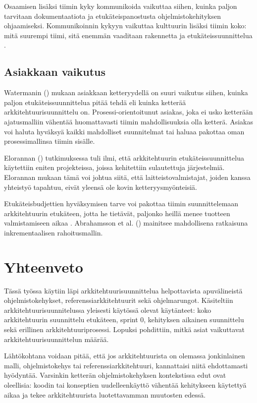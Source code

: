Osaamisen lisäksi tiimin kyky kommunikoida vaikuttaa siihen, kuinka paljon tarvitaan dokumentaatiota ja etukäteispanostusta ohjelmistokehityksen ohjaamiseksi. Kommunikoinnin kykyyn vaikuttaa kulttuurin lisäksi tiimin koko: mitä suurempi tiimi, sitä enemmän vaaditaan rakennetta ja etukäteissuunnittelua \citep{waterman_how_2015}.

\section{Asiakkaan vaikutus}
Watermanin (\citeyear{waterman_how_2015}) mukaan asiakkaan ketteryydellä on suuri vaikutus siihen, kuinka paljon etukäteissuunnittelua pitää tehdä eli kuinka ketterää arkkitehtuurisuunnittelu on. Prosessi-orientoitunut asiakas, joka ei usko ketterään ajatusmalliin vähentää huomattavasti tiimin mahdollisuuksia olla ketterä. Asiakas voi haluta hyväksyä kaikki mahdolliset suunnitelmat tai haluaa pakottaa oman prosessimallinsa tiimin sisälle. 

Elorannan (\citeyear{eloranta2015techniques}) tutkimuksessa tuli ilmi, että arkkitehtuurin etukäteissuunnittelua käytettiin eniten projekteissa, joissa kehitettiin sulautettuja järjestelmiä. Elorannan mukaan tämä voi johtua siitä, että laitteistovalmistajat, joiden kanssa yhteistyö tapahtuu, eivät yleensä ole kovin ketteryysmyönteisiä.

Etukäteisbudjettien hyväksymisen tarve voi pakottaa tiimin suunnittelemaan arkkitehtuurin etukäteen, jotta he tietävät, paljonko heillä menee tuotteen valmistamiseen aikaa \citep{waterman_how_2015}. Abrahamsson et al. (\citeyear{abrahamsson2010agility}) mainitsee mahdollisena ratkaisuna inkrementaalisen rahoitusmallin. 

\chapter{Yhteenveto}
Tässä työssa käytiin läpi arkkitehtuurisuunnittelua helpottavista apuvälineistä ohjelmistokehykset, referenssiarkkitehtuurit sekä ohjelmarungot. Käsiteltiin arkkitehtuurisuunnitelussa yleisesti käytössä olevat käytänteet: koko arkkitehtuurin suunnittelu etukäteen, sprint 0, kehityksen aikainen suunnittelu sekä erillinen arkkitehtuuriprosessi. Lopuksi pohdittiin, mitkä asiat vaikuttavat arkkitehtuurisuunnittelun määrää.

Lähtökohtana voidaan pitää, että jos arkkitehtuurista on olemassa jonkinlainen malli, ohjelmistokehys tai referenssiarkkitehtuuri, kannattaisi niitä ehdottamasti hyödyntää. Varsinkin ketterän ohjelmistokehyksen kontekstissa edut ovat oleellisia: koodin tai konseptien uudelleenkäyttö vähentää kehitykseen käytettyä aikaa ja tekee arkkitehtuurista luotettavamman muutosten edessä.

